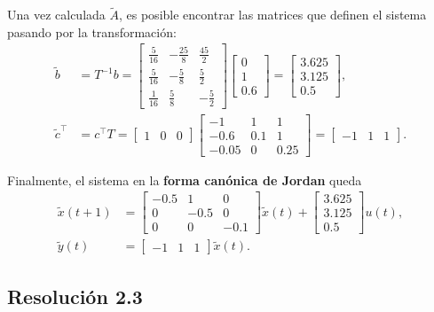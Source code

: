 \documentclass[
  11pt,
  letterpaper,
   addpoints,
  answers
  ]{exam}
\begin{document}
\begin{questions}
\begin{solution}
Una vez calculada $\tilde A$, es posible encontrar las matrices que definen el sistema pasando por la transformación:
\begin{align}
\tilde b &= T^{-1}b
= 
\begin{bmatrix}
\frac{5}{16} & -\frac{25}{8} & \frac{45}{2}\\
\frac{5}{16} & -\frac{5}{8}  & \frac{5}{2}\\
\frac{1}{16} & \frac{5}{8}   & -\frac{5}{2}
\end{bmatrix}
\begin{bmatrix}0\\1\\0.6\end{bmatrix}
=
\begin{bmatrix}
3.625\\[2pt] 3.125\\[2pt] 0.5
\end{bmatrix}, \label{eq:btilde}\\[4pt]
\tilde c^{\top} &= c^{\top}T 
= \begin{bmatrix}1&0&0\end{bmatrix}
\begin{bmatrix}
-1 & 1 & 1\\
-0.6 & 0.1 & 1\\
-0.05 & 0 & 0.25
\end{bmatrix}
= \begin{bmatrix}-1 & 1 & 1\end{bmatrix}. \label{eq:ctilde}
\end{align}

Finalmente, el sistema en la \textbf{forma canónica de Jordan} queda
\begin{align}
\tilde x(t+1) &=
\begin{bmatrix}
-0.5 & 1 & 0\\
0 & -0.5 & 0\\
0 & 0 & -0.1
\end{bmatrix}\tilde x(t)+
\begin{bmatrix}
3.625\\[2pt] 3.125\\[2pt] 0.5
\end{bmatrix}u(t), \label{eq:Jordan-final}\\
\tilde y(t) &= \begin{bmatrix}-1 & 1 & 1\end{bmatrix}\tilde x(t).
\end{align}

\subsection*{Resolución 2.3}


\end{solution}
\end{questions}
\end{document}
